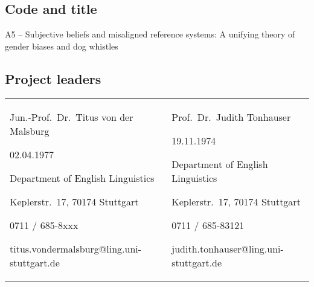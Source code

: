 \documentclass[11pt]{article}
\begin{document}


\subsection{Code and title}

A5 -- Subjective beliefs and misaligned reference systems: A unifying theory of gender biases and dog whistles


\subsection{Project leaders}

\begin{tabular}{p{}p{}}
  Jun.-Prof.\ Dr.\ Titus von der Malsburg \par
  02.04.1977 \par
  Department of English Linguistics \par
  Keplerstr.\ 17, 70174 Stuttgart \par
  0711 / 685-8xxx \par
  titus.vondermalsburg@ling.uni-stuttgart.de
  &
  Prof.\ Dr.\ Judith Tonhauser \par
  19.11.1974 \par
  Department of English Linguistics \par
  Keplerstr.\ 17, 70174 Stuttgart \par
  0711 / 685-83121 \par
  judith.tonhauser@ling.uni-stuttgart.de
\end{tabular}
\end{document}
